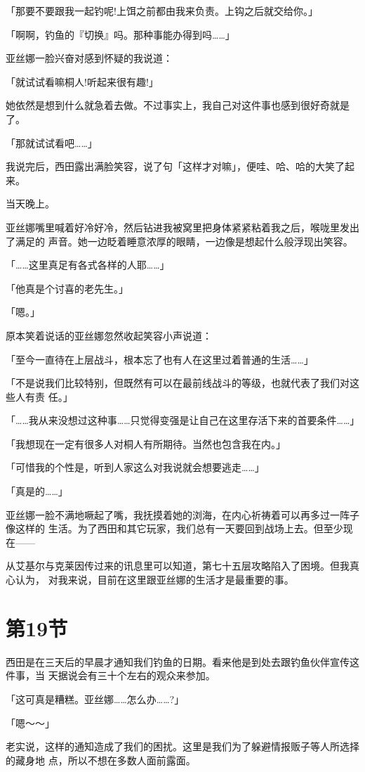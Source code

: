 \documentclass[11pt]{book}
\begin{document}
「那要不要跟我一起钓呢!上饵之前都由我来负责。上钩之后就交给你。」

「啊啊，钓鱼的『切换』吗。那种事能办得到吗……」

亚丝娜一脸兴奋对感到怀疑的我说道：

「就试试看嘛桐人!听起来很有趣!」

她依然是想到什么就急着去做。不过事实上，我自己对这件事也感到很好奇就是了。

「那就试试看吧……」

我说完后，西田露出满脸笑容，说了句「这样才对嘛」，便哇、哈、哈的大笑了起来。

当天晚上。

亚丝娜嘴里喊着好冷好冷，然后钻进我被窝里把身体紧紧粘着我之后，喉咙里发出了满足的
声音。她一边眨着睡意浓厚的眼睛，一边像是想起什么般浮现出笑容。

「……这里真足有各式各样的人耶……」

「他真是个讨喜的老先生。」

「嗯。」

原本笑着说话的亚丝娜忽然收起笑容小声说道：

「至今一直待在上层战斗，根本忘了也有人在这里过着普通的生活……」

「不是说我们比较特别，但既然有可以在最前线战斗的等级，也就代表了我们对这些人有责
任。」

「……我从来没想过这种事……只觉得变强是让自己在这里存活下来的首要条件……」

「我想现在一定有很多人对桐人有所期待。当然也包含我在内。」

「可惜我的个性是，听到人家这么对我说就会想要逃走……」

「真是的……」

亚丝娜一脸不满地噘起了嘴，我抚摸着她的浏海，在内心祈祷着可以再多过一阵子像这样的
生活。为了西田和其它玩家，我们总有一天要回到战场上去。但至少现在——

从艾基尔与克莱因传过来的讯息里可以知道，第七十五层攻略陷入了困境。但我真心认为，
对我来说，目前在这里跟亚丝娜的生活才是最重要的事。
\section{第19节}
\label{sec:org500470d}
西田是在三天后的早晨才通知我们钓鱼的日期。看来他是到处去跟钓鱼伙伴宣传这件事，当
天据说会有三十个左右的观众来参加。

「这可真是糟糕。亚丝娜……怎么办……?」

「嗯～～」

老实说，这样的通知造成了我们的困扰。这里是我们为了躲避情报贩子等人所选择的藏身地
点，所以不想在多数人面前露面。
\end{document}
